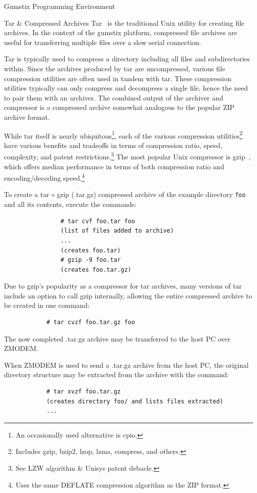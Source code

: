 \documentclass{article}
\begin{document}
\begin{section}{Gumstix Programming Environment}
		\begin{subsection}{Tar \& Compressed Archives}\label{tar}
			Tar~\cite{FSF:GNUTar} is the traditional Unix utility for creating file
			archives.  In the context of the gumstix platform, compressed file archives
			are useful for transferring multiple files over a slow serial connection.

			Tar is typically used to compress a directory including all files and
			subdirectories within.  Since the archives produced by tar are
			uncompressed, various file compression utilities are often used in tandem
			with tar.  These compression utilities typically can only compress and
			decompress a single file, hence the need to pair them with an archiver.
			The combined output of the archiver and compressor is a compressed archive
			somewhat analogous to the popular ZIP archive format.

			While tar itself is nearly ubiquitous\footnote{An occasionally used
			alternative is cpio.}, each of the various compression
			utilities\footnote{Includes gzip, bzip2, lzop, lzma, compress, and others.}
			have various benefits and tradeoffs in terms of compression ratio, speed,
			complexity, and patent restrictions.\footnote{See LZW algorithm \& Unisys
			patent debacle.}  The most popular Unix compressor is
			gzip~\cite{Gailly:gzip}, which offers median performance in terms of both
			compression ratio and encoding/decoding speed.\footnote{Uses the same
			DEFLATE compression algorithm as the ZIP format.}

			To create a tar\,+\,gzip (.tar.gz) compressed archive of the example
			directory \texttt{foo} and all its contents, execute the commands:
			\begin{verbatim}
				# tar cvf foo.tar foo
				(list of files added to archive)
				...
				(creates foo.tar)
				# gzip -9 foo.tar
				(creates foo.tar.gz)
			\end{verbatim}
			Due to gzip's popularity as a compressor for tar archives, many versions of
			tar include an option to call gzip internally, allowing the entire
			compressed archive to be created in one command:
			\begin{verbatim}
			# tar cvzf foo.tar.gz foo
			\end{verbatim}
			The now completed .tar.gz archive may be transferred to the host PC over
			ZMODEM.

			When ZMODEM is used to send a .tar.gz archive from the host PC, the
			original directory structure may be extracted from the archive with the
			command:
			\begin{verbatim}
			# tar xvzf foo.tar.gz
			(creates directory foo/ and lists files extracted)
			...
			\end{verbatim}
		\end{subsection}


\end{section}
\end{document}
